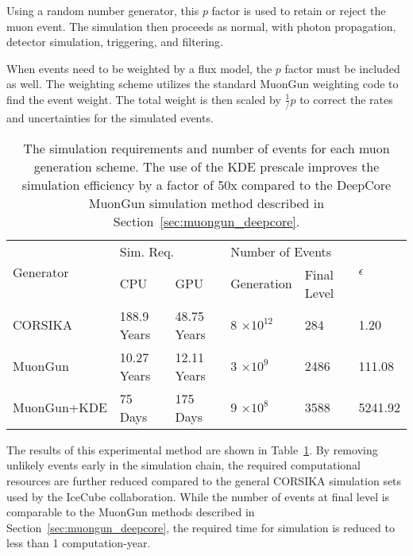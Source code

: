 Using a random number generator, this $p$ factor is used to retain or reject the muon event.
The simulation then proceeds as normal, with photon propagation, detector simulation, triggering, and filtering.

When events need to be weighted by a flux model, the $p$ factor must be included as well. 
The weighting scheme utilizes the standard MuonGun weighting code to find the event weight. 
The total weight is then scaled by $\frac{1}/{p}$ to correct the rates and uncertainties for the simulated events.


\begin{table}[]
\centering
\begin{tabular}{@{}llllll@{}}
\toprule
\multirow{2}{*}{Generator} & \multicolumn{2}{l}{Sim. Req.} & \multicolumn{2}{l}{Number of Events} & \multirow{2}{*}{$\epsilon$} \\
                           & CPU                  & GPU                  & Generation               & Final Level         &                             \\ \midrule
CORSIKA                    & 188.9 Years          & 48.75 Years          & 8 $\times 10^{12}$         & 284                    & 1.20                        \\
MuonGun         & 10.27 Years          & 12.11 Years          & 3 $\times 10^9$          & 2486                   & 111.08                      \\
MuonGun+KDE            & 75 Days              & 175 Days             & 9 $\times 10^8$          & 3588                   & 5241.92                     \\ \bottomrule
\end{tabular}
\caption{The simulation requirements and number of events for each muon generation scheme. The use of the KDE prescale improves the simulation efficiency by a factor of 50x compared to the DeepCore MuonGun simulation method described in Section~\ref{sec:muongun_deepcore}.}
\label{tab:kde_stats}
\end{table}

The results of this experimental method are shown in Table~\ref{tab:kde_stats}.
By removing unlikely events early in the simulation chain, the required computational resources are further reduced compared to the general CORSIKA simulation sets used by the IceCube collaboration.
While the number of events at final level is comparable to the MuonGun methods described in Section~\ref{sec:muongun_deepcore}, the required time for simulation is reduced to less than 1 computation-year.

